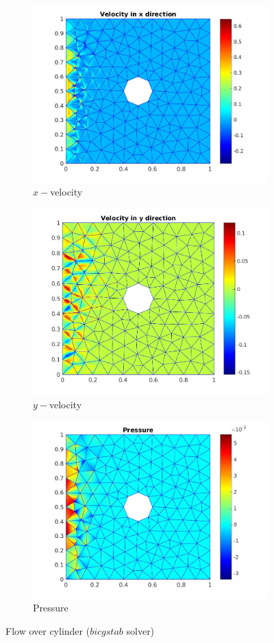 \documentclass[a4paper,twoside,openright]{book}
\begin{document}
\begin{figure}
\begin{subfigure}{\textwidth}	
  \includegraphics[width=0.8\linewidth]{cylinder_bicgstab_vx.jpg}
      \caption{$x-$velocity}
    \label{x_vel_stoke_bicgstab}
\end{subfigure}
\begin{subfigure}{\textwidth}	
      \includegraphics[width=0.8\linewidth]{cylinder_bicgstab_vy.jpg}
    \caption{$y-$velocity}
     \label{y_vel_stoke_bicgstab}
\end{subfigure}
\begin{subfigure}{\textwidth}	
    \includegraphics[width=0.8\linewidth]{cylinder_bicgstab_pressure.jpg}
    \caption{Pressure}
      \label{pressure_stoke_bicgstab}
\end{subfigure}
\caption{Flow over cylinder ($bicgstab$ solver)}
\label{flow_over_cylinder_bicgstab}
\end{figure}
\end{document}
